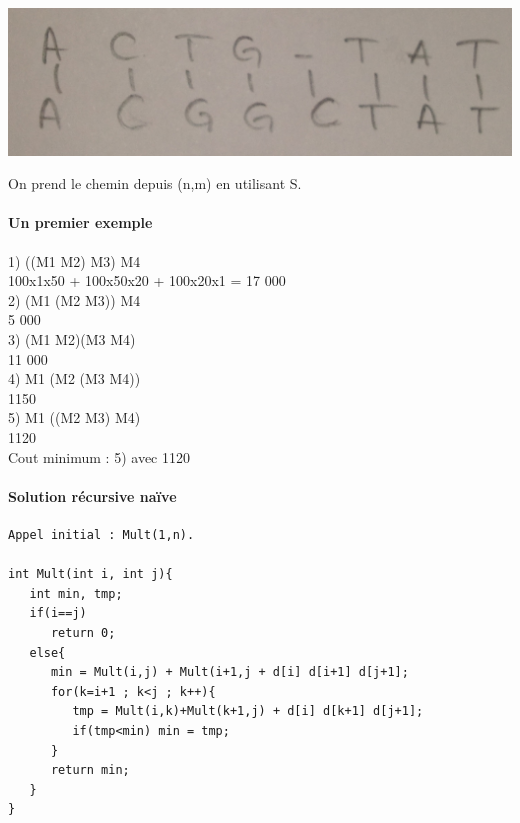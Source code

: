 \includegraphics[width=15cm]{Photo0091}

On prend le chemin depuis (n,m) en utilisant S.

\paragraph{Un premier exemple}

1) ((M1 M2) M3) M4\\
   100x1x50 + 100x50x20 + 100x20x1 = 17 000\\
   
2) (M1 (M2 M3)) M4\\
   5 000\\
   
3) (M1 M2)(M3 M4)\\
   11 000\\

4) M1 (M2 (M3 M4))\\
   1150\\

5) M1 ((M2 M3) M4)\\
   1120\\
   
Cout minimum : 5) avec 1120
 
\paragraph{Solution récursive naïve}

\begin{verbatim}
Appel initial : Mult(1,n).

int Mult(int i, int j){
   int min, tmp;
   if(i==j)
      return 0;
   else{
      min = Mult(i,j) + Mult(i+1,j + d[i] d[i+1] d[j+1];
      for(k=i+1 ; k<j ; k++){
         tmp = Mult(i,k)+Mult(k+1,j) + d[i] d[k+1] d[j+1];
         if(tmp<min) min = tmp;
      }
      return min;
   }
}
\end{verbatim}
